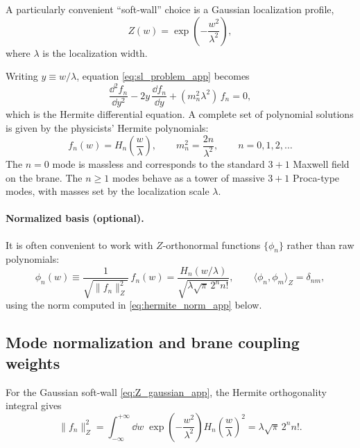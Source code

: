 \documentclass[11pt]{article}
\newcommand{\Z}{Z}              %
\begin{document}
A particularly convenient ``soft-wall'' choice is a Gaussian localization profile,
\begin{equation}
\Z(w)=\exp\!\left(-\frac{w^2}{\lambda^2}\right),
\label{eq:Z_gaussian_app}
\end{equation}
where \(\lambda\) is the localization width.

Writing \(y\equiv w/\lambda\), equation \eqref{eq:sl_problem_app} becomes
\begin{equation}
\frac{\dd^2 f_n}{\dd y^2} - 2y\,\frac{\dd f_n}{\dd y} + (m_n^2\lambda^2)\,f_n = 0,
\label{eq:hermite_ode_app}
\end{equation}
which is the Hermite differential equation. A complete set of polynomial solutions is
given by the physicists' Hermite polynomials:
\begin{equation}
f_n(w)=H_n\!\left(\frac{w}{\lambda}\right),
\qquad
m_n^2=\frac{2n}{\lambda^2},
\qquad n=0,1,2,\ldots
\label{eq:hermite_spectrum_app}
\end{equation}
The \(n=0\) mode is massless and corresponds to the standard \(3+1\) Maxwell field on
the brane. The \(n\ge 1\) modes behave as a tower of massive \(3+1\) Proca-type modes,
with masses set by the localization scale \(\lambda\).

\paragraph{Normalized basis (optional).}
It is often convenient to work with \(\Z\)-orthonormal functions
\(\{\phi_n\}\) rather than raw polynomials:
\begin{equation}
\phi_n(w)\equiv \frac{1}{\sqrt{\|f_n\|_{\Z}^2}}\,f_n(w)
=
\frac{H_n(w/\lambda)}{\sqrt{\lambda\sqrt{\pi}\,2^n n!}},
\qquad
\langle \phi_n,\phi_m\rangle_{\Z}=\delta_{nm},
\label{eq:hermite_normalized_app}
\end{equation}
using the norm computed in \eqref{eq:hermite_norm_app} below.

\subsection{Mode normalization and brane coupling weights}
\label{app:mode_norm_and_coupling}

For the Gaussian soft-wall \eqref{eq:Z_gaussian_app}, the Hermite orthogonality integral gives
\begin{equation}
\|f_n\|_{\Z}^2
=
\int_{-\infty}^{+\infty}\dd w\;
\exp\!\left(-\frac{w^2}{\lambda^2}\right)
H_n\!\left(\frac{w}{\lambda}\right)^2
=
\lambda\sqrt{\pi}\,2^n n!.
\label{eq:hermite_norm_app}
\end{equation}
\end{document}
